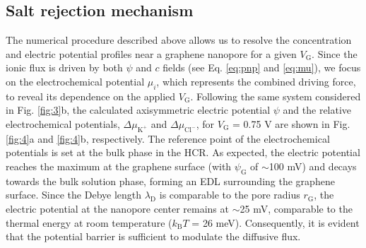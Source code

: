 \documentclass[journal=langd5,email=true, hyperref=true, keywords=false]{achemso}
\newcommand{\Fig}{Fig.}
\begin{document}
\subsection{Salt rejection mechanism}
\label{sec:mechanism}

The numerical procedure described above allows us to resolve the
concentration and electric potential profiles near a graphene
nanopore for a given $V_{\mathrm{G}}$. Since the ionic flux is driven
by both $\psi$ and $c$ fields (see Eq. \eqref{eq:pnp} and \eqref{eq:mu}),
we focus on the electrochemical potential $\mu_{i}$, which represents
the combined driving force, to reveal its dependence on the applied
$V_{\mathrm{G}}$. Following the same system considered in \Fig{}
\ref{fig:3}b, the calculated axisymmetric electric potential $\psi$
and the relative electrochemical potentials,
$\Delta \mu_{\mathrm{K^{+}}}$ and $\Delta \mu_{\mathrm{Cl^{-}}}$, for
$V_{\mathrm{G}}$ = 0.75 V are shown in \Fig{} \ref{fig:4}a and
\ref{fig:4}b, respectively. The reference point of the electrochemical
potentials is set at the bulk phase in the HCR. As expected, the
electric potential reaches the maximum at the graphene surface (with
$\psi_{\mathrm{G}}$ of $\sim$100 mV) and decays towards the bulk
solution phase, forming an EDL surrounding the graphene surface. Since
the Debye length $\lambda_{\mathrm{D}}$ is comparable to the
pore radius $r_{\mathrm{G}}$, the electric potential at the nanopore
center remains at $\sim$25 mV, comparable to the thermal energy at
room temperature ($k_{\mathrm{B}}T$ = 26 meV). Consequently, it is
evident that the potential barrier is sufficient to modulate the
diffusive flux.
\end{document}
